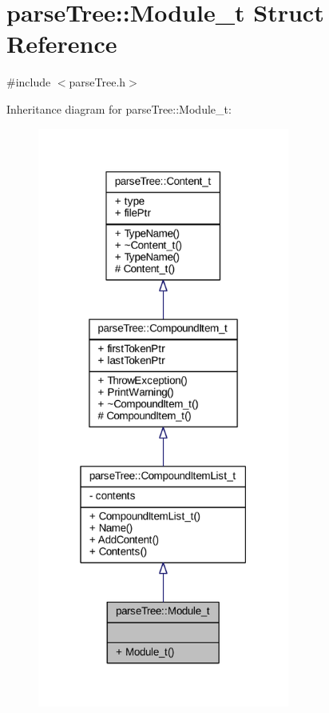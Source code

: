 \hypertarget{structparse_tree_1_1_module__t}{}\section{parse\+Tree\+:\+:Module\+\_\+t Struct Reference}
\label{structparse_tree_1_1_module__t}


{\ttfamily \#include $<$parse\+Tree.\+h$>$}



Inheritance diagram for parse\+Tree\+:\+:Module\+\_\+t\+:
\nopagebreak
\begin{figure}[H]
\begin{center}
\leavevmode
\includegraphics[width=235pt]{structparse_tree_1_1_module__t__inherit__graph}
\end{center}
\end{figure}


